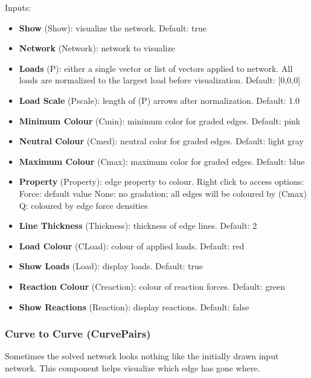 Inputs:
\begin{itemize}
    \setlength\itemsep{0.05em}
    \item \textbf{Show} (Show): visualize the network. {\color{gray} Default: true}
    \item \textbf{Network} (Network): network to visualize
    \item \textbf{Loads} (P): either a single vector or list of vectors applied to network. All loads are normalized to the largest load before visualization. {\color{gray} Default: [0,0,0]}
    \item \textbf{Load Scale} (Pscale): length of (P) arrows after normalization. {\color{gray} Default: 1.0}
    \item \textbf{Minimum Colour} (Cmin): minimum color for graded edges. {\color{gray} Default: \color{kpink} pink}
    \item \textbf{Neutral Colour} (Cmed): neutral color for graded edges. {\color{gray} Default: \color{lightgray} light gray}
    \item \textbf{Maximum Colour} (Cmax): maximum color for graded edges. {\color{gray} Default: \color{kblue} blue}
    \item \textbf{Property} (Property): edge property to colour. Right click to access options:
    \subitem Force: {\color{gray} default value}
    \subitem None: no gradation; all edges will be coloured by (Cmax)
    \subitem Q: coloured by edge force densities
    \item \textbf{Line Thickness} (Thickness): thickness of edge lines. {\color{gray} Default: 2}
    \item \textbf{Load Colour} (CLoad): colour of applied loads. {\color{gray} Default: \color{red} red}
    \item \textbf{Show Loads} (Load): display loads. {\color{gray} Default: true}
    \item \textbf{Reaction Colour} (Creaction): colour of reaction forces. {\color{gray} Default: \color{kgreen} green}
    \item \textbf{Show Reactions} (Reaction): display reactions. {\color{gray} Default: false}
\end{itemize}

\subsubsection{Curve to Curve (CurvePairs)}
Sometimes the solved network looks nothing like the initially drawn input network. This component helps visualize which edge has gone where.

